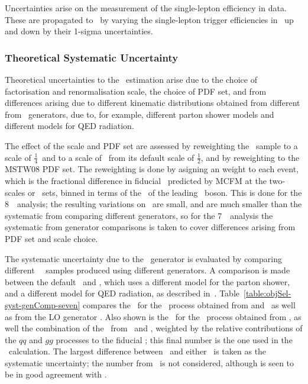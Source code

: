 Uncertainties arise on the measurement of the single-lepton efficiency in data.
These are propagated to \CZZ\ by varying the single-lepton trigger efficiencies
in~ up and down by their 1-sigma uncertainties.

\subsubsection{Theoretical Systematic Uncertainty}

Theoretical uncertainties to the \CZZ\ estimation arise due to the choice of
factorisation and renormalisation scale, the choice of PDF set, and from differences
arising due to different kinematic distributions obtained from different from \mc\
generators, due to, for example, different parton shower models and different
models for QED radiation.

The effect of the scale and PDF set are assessed by
reweighting the \powhegbox\ sample to a scale of $\frac{1}{4}$\mZZ\ and to a
scale of \mZZ\ from its default scale of $\frac{1}{2}$\mZZ, and by reweighting
to the MSTW08 PDF set. The reweighting is done by asigning an weight to each
event, which is the fractional difference in fiducial \cx\ predicted by MCFM at
the two-scales or \partDF\ sets, binned in terms of the \pt\ of the leading \Z\ boson.
This is done for the 8~\tev\ analysis; the resulting
variations on \CZZ\ are small, and are much smaller than the systematic from comparing
different generators, so for the 7~\tev\ analysis the systematic from generator
comparisons is taken to cover differences arising from PDF set and scale choice.

The systematic uncertainty due to the \mc\ generator is evaluated by comparing
different \qqZZ\ \mc\ samples produced using different generators.
A comparison is made between the default \powhegbox\ and \sherpa,
which uses a different model for the parton shower, and a different model for
QED radiation, as described in~\sec{gen-comparisons}.
Table~\ref{table:objSel-syst-genComp-seven} compares the \CZZ\ for the \qqZZ\
process obtained from \powhegbox and \sherpa\, as well as from the
LO generator \pythia.  Also shown is the \CZZ\ for the
\ggZZ\ process obtained from \ggtwoZZ, as well the combination of the
\CZZ\ from \powhegbox\ and \ggtwoZZ, weighted by the relative contributions of
the $qq$ and $gg$ processes to the fiducial \cx; this final number is the one
used in the \cx\ calculation. The largest difference between \powhegbox\ and
either \sherpa\ is taken as the systematic uncertainty; the number from \pythia\
is not considered, although is seen to be in good agreement with \powhegbox.

